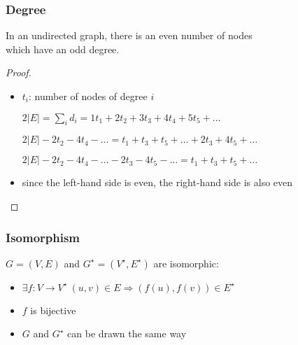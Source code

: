 \documentclass[dvipsnames]{beamer}
\begin{document}
\begin{frame}
  \frametitle{Degree}

  \begin{theorem}
    In an undirected graph, there is an even number of nodes\\
    which have an odd degree.
  \end{theorem}

  \pause
  \begin{proof}
    \begin{itemize}
      \item $t_i$: number of nodes of degree $i$

      \pause
$2|E| = \sum_i d_i = 1t_1 + 2t_2 + 3t_3 + 4t_4 + 5t_5 + \dots$

\pause
$2|E| - 2t_2 - 4t_4 - \dots = t_1 + t_3 + t_5 + \dots + 2t_3 + 4t_5 + \dots$

\pause
$2|E| - 2t_2 - 4t_4 - \dots - 2t_3 - 4t_5 - \dots = t_1 + t_3 + t_5 + \dots$

      \pause
      \item since the left-hand side is even, the right-hand side is also even
    \end{itemize}
  \end{proof}
\end{frame}

\begin{frame}
  \frametitle{Isomorphism}

  \begin{definition}
    $G=(V,E)$ and $G^\star=(V^\star,E^\star)$ are \alert{isomorphic}:
    \begin{itemize}
      \item $\exists f: V \rightarrow V^\star~(u,v) \in E \Rightarrow (f(u),f(v)) \in E^\star$
      \item $f$ is bijective
    \end{itemize}
  \end{definition}

  \pause
  \begin{itemize}
    \item $G$ and $G^\star$ can be drawn the same way
  \end{itemize}
\end{frame}
\end{document}
